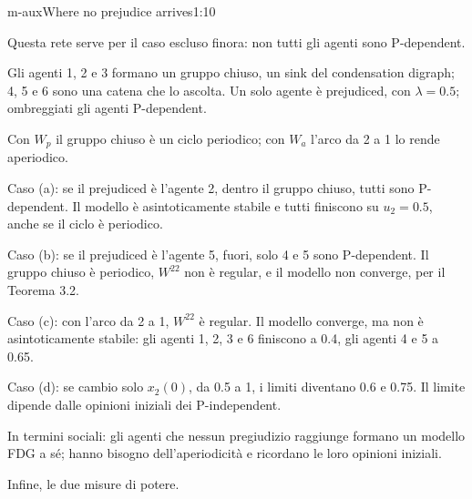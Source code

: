 \begin{slidedue}{m-aux}{Where no prejudice arrives}{1:10}
  \begin{discorso}
    \item Questa rete serve per il caso escluso finora: non tutti gli agenti sono P-dependent.
    \item Gli agenti 1, 2 e 3 formano un gruppo chiuso, un sink del condensation digraph; 4, 5 e 6 sono una catena che lo ascolta. Un solo agente è prejudiced, con $\lambda=0.5$; ombreggiati gli agenti P-dependent.
    \item Con $W_p$ il gruppo chiuso è un ciclo periodico; con $W_a$ l'arco da 2 a 1 lo rende aperiodico.
    \item \clic Caso (a): se il prejudiced è l'agente 2, dentro il gruppo chiuso, tutti sono P-dependent. Il modello è asintoticamente stabile e tutti finiscono su $u_2=0.5$, anche se il ciclo è periodico.
    \item Caso (b): se il prejudiced è l'agente 5, fuori, solo 4 e 5 sono P-dependent. Il gruppo chiuso è periodico, $W^{22}$ non è regular, e il modello non converge, per il Teorema 3.2.
    \item Caso (c): con l'arco da 2 a 1, $W^{22}$ è regular. Il modello converge, ma non è asintoticamente stabile: gli agenti 1, 2, 3 e 6 finiscono a 0.4, gli agenti 4 e 5 a 0.65.
    \item Caso (d): se cambio solo $x_2(0)$, da 0.5 a 1, i limiti diventano 0.6 e 0.75. Il limite dipende dalle opinioni iniziali dei P-independent.
    \item In termini sociali: gli agenti che nessun pregiudizio raggiunge formano un modello FDG a sé; hanno bisogno dell'aperiodicità e ricordano le loro opinioni iniziali.
    \item Infine, le due misure di potere.
  \end{discorso}
\end{slidedue}

